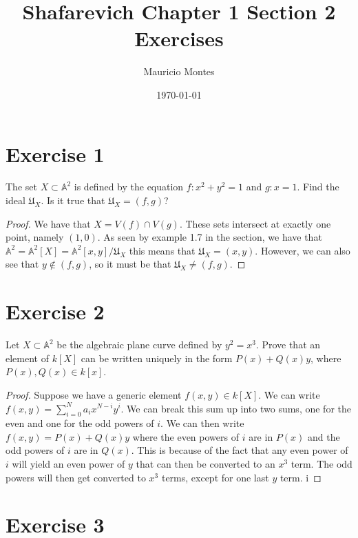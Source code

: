 \documentclass[12pt]{article}
\title{Shafarevich Chapter 1 Section 2 Exercises}
\author{Mauricio Montes}
\date{\today}
\begin{document}
\maketitle

\section*{Exercise 1}

The set $ X \subset \mathbb{A}^2 $ is defined by the equation $ f : x^2 + y^2 = 1$ 
and $ g: x = 1$. Find the ideal $\mathfrak{U}_X$. Is it true that $\mathfrak{U}_X = (f,g)$?


\begin{proof}

  We have that $X = V(f) \cap V(g)$. These sets intersect at exactly one point, namely $(1,0)$. As
  seen by example 1.7 in the section, we have that 
  $\mathbb{A}^2 = \mathbb{A}^2 [X] = \mathbb{A}^2 [x,y] / \mathfrak{U}_X$
  this means that $\mathfrak{U}_X = (x,y)$. However, we can also see that $ y \notin (f,g)$, so it must
  be that $\mathfrak{U}_X \neq (f,g)$.

\end{proof}

\section*{Exercise 2}

Let $X \subset \mathbb{A}^2$ be the algebraic plane curve defined by $ y^2 =x^3$. Prove that an
element of $k[X]$ can be written uniquely in the form $P(x) + Q(x)y$, where $P(x),Q(x) \in k[x]$.

\begin{proof}

  Suppose we have a generic element $f(x,y) \in k[X]$. We can write 
  $f(x,y) = \sum_{i=0}^{N}a_{i}x^{N-i}y^{i}$. We can break this sum up into two sums, one for the even
  and one for the odd powers of $i$. We can then write $f(x,y) = P(x) + Q(x)y$ where the even powers
  of $i$ are in $P(x)$ and the odd powers of $i$ are in $Q(x)$. This is because of the fact that any
  even power of $i$ will yield an even power of $y$ that can then be converted to an $x^3$ term. The
  odd powers will then get converted to $x^3$ terms, except for one last $y$ term. i

\end{proof}

\section*{Exercise 3}
\end{document}
